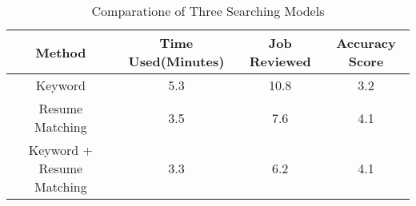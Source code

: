 \begin{table}[ht]
\caption{Comparatione of Three Searching Models } %
\centering %
\begin{tabular}{  | c | c | c | c | }
 \hline
 Method                    &  Time Used(Minutes)    & Job Reviewed & Accuracy Score  \\
 \hline
 Keyword                   & 5.3                    & 10.8        &       3.2         \\
 \hline
 Resume Matching           & 3.5                    & 7.6         &       4.1         \\
  \hline
 Keyword + Resume Matching & 3.3                    & 6.2         &       4.1       \\
  \hline
\end{tabular}
\label{tab:methodcompare} %
\end{table}


